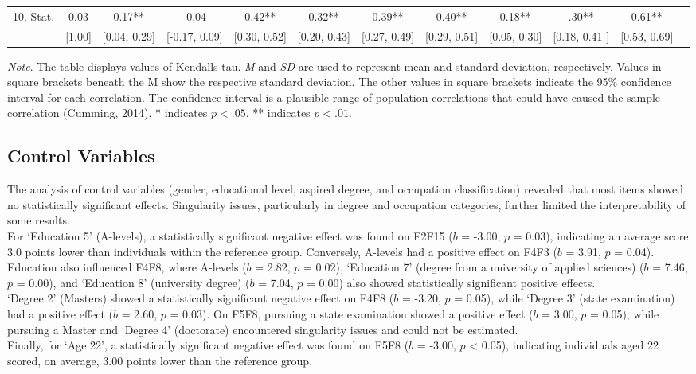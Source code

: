 \documentclass[
  12pt,
  a4paper,
  twoside]{article}
\begin{document}
\begin{table}[htbp]
{\begin{minipage}{\textheight}
\begin{tabular}{lccccccccccc}
10. Stat. & 0.03 & 0.17** & -0.04 & 0.42** & 0.32** & 0.39** & 0.40** & 0.18** & .30** & 0.61** \\
   & [1.00] & [0.04, 0.29] & [-0.17, 0.09] & [0.30, 0.52] & [0.20, 0.43] & [0.27, 0.49] & [0.29, 0.51] & [0.05, 0.30]& [0.18, 0.41 ] & [0.53, 0.69] \\
\hline
\end{tabular}
\par %
\small\textit{Note}. The table displays values of Kendalls tau. \textit{M} and \textit{SD} are used to represent mean and standard deviation, respectively. Values in square brackets beneath the M show the respective standard deviation. The other values in square brackets indicate the 95\% confidence interval for each correlation. The confidence interval is a plausible range of population correlations that could have caused the sample correlation (Cumming, 2014). * indicates $p < .05$. ** indicates $p < .01$.
\end{minipage}%
}
\end{table}

\subsection{Control Variables}\label{control-variables}

The analysis of control variables (gender, educational level, aspired degree, and occupation classification) revealed that most items showed no statistically significant effects. Singularity issues, particularly in degree and occupation categories, further limited the interpretability of some results.\\
For `Education 5' (A-levels), a statistically significant negative effect was found on F2F15 (\(b\) = -3.00, \(p\) = 0.03), indicating an average score 3.0 points lower than individuals within the reference group. Conversely, A-levels had a positive effect on F4F3 (\(b\) = 3.91, \(p\) = 0.04). Education also influenced F4F8, where A-levels (\(b\) = 2.82, \(p\) = 0.02), `Education 7' (degree from a university of applied sciences) (\(b\) = 7.46, \(p\) = 0.00), and `Education 8' (university degree) (\(b\) = 7.04, \(p\) = 0.00) also showed statistically significant positive effects.\\
`Degree 2' (Masters) showed a statistically significant negative effect on F4F8 (\(b\) = -3.20, \(p\) = 0.05), while `Degree 3' (state examination) had a positive effect (\(b\) = 2.60, \(p\) = 0.03). On F5F8, pursuing a state examination showed a positive effect (\(b\) = 3.00, \(p\) = 0.05), while pursuing a Master and `Degree 4' (doctorate) encountered singularity issues and could not be estimated.\\
Finally, for `Age 22', a statistically significant negative effect was found on F5F8 (\(b\) = -3.00, \(p\) \textless{} 0.05), indicating individuals aged 22 scored, on average, 3.00 points lower than the reference group.
\end{document}
